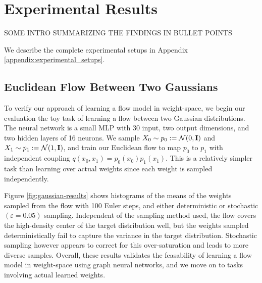 
\chapter{Experimental Results}\label{chapter:results}

{\color{red} SOME INTRO SUMMARIZING THE FINDINGS IN BULLET POINTS}

We describe the complete experimental setups in Appendix \ref{appendix:experimental_setups}.

\section{Euclidean Flow Between Two Gaussians} \label{sec:gaussian_flow}

To verify our approach of learning a flow model in weight-space, we begin our evaluation the toy task of learning a flow between two Gaussian distributions. The neural network is a small MLP with 30 input, two output dimensions, and two hidden layers of 16 neurons. We sample $X_0 \sim p_0 := \mathcal{N}(0, \mathbf{I})$ and $X_1 \sim p_1 := \mathcal{N}(1, \mathbf{I})$, and train our Euclidean flow to map $p_0$ to $p_1$ with independent coupling $q(x_0, x_1) = p_0(x_0)p_1(x_1)$. This is a relatively simpler task than learning over actual weights since each weight is sampled independently. 

Figure \ref{fig:gaussian-results} shows histograms of the means of the weights sampled from the flow with 100 Euler steps, and either deterministic or stochastic $(\varepsilon=0.05)$ sampling. Independent of the sampling method used, the flow covers the high-density center of the target distribution well, but the weights sampled deterministically fail to capture the variance in the target distribution. Stochastic sampling however appears to correct for this over-saturation and leads to more diverse samples. Overall, these results validates the feasability of learning a flow model in weight-space using graph neural networks, and we move on to tasks involving actual learned weights. 

